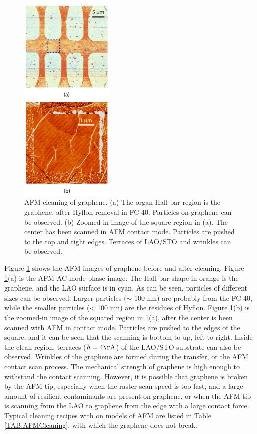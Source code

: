 \documentclass[pdflatex, sectionletters, 12pt]{pittetd}    %
\begin{document}
\begin{figure}[p]
	\centering
	\includegraphics[width=0.4\textwidth]{Drawing/GrapheneAC.pdf}
	\caption{AFM cleaning of graphene. (a) The organ Hall bar region is the graphene, after Hyflon removal in FC-40. Particles on graphene can be observed. (b) Zoomed-in image of the square region in (a). The center has been scanned in AFM contact mode. Particles are pushed to the top and right edges. Terraces of LAO/STO and wrinkles can be observed.}
	\label{FIG:GrapheneAC}
\end{figure}

Figure \ref{FIG:GrapheneAC} shows the AFM images of graphene before and after cleaning. Figure \ref{FIG:GrapheneAC}(a) is the AFM AC mode phase image. The Hall bar shape in orange is the graphene, and the LAO surface is in cyan. As can be seen, particles of different sizes can be observed. Larger particles ($\sim$ 100 nm) are probably from the FC-40, while the smaller particles (< 100 nm) are the residues of Hyflon. Figure \ref{FIG:GrapheneAC}(b) is the zoomed-in image of the squared region in \ref{FIG:GrapheneAC}(a), after the center is been scanned with AFM in contact mode. Particles are pushed to the edges of the square, and it can be seen that the scanning is bottom to up, left to right. Inside the clean region, terraces ($h = 4 \mathrm{\AA}$) of the LAO/STO substrate can also be observed. Wrinkles of the graphene are formed during the transfer, or the AFM contact scan process. The mechanical strength of graphene is high enough\cite{lee2008measurement} to withstand the contact scanning. However, it is possible that graphene is broken by the AFM tip, especially when the raster scan speed is too fast, and a large amount of resilient contaminants are present on graphene, or when the AFM tip is scanning from the LAO to graphene from the edge with a large contact force. Typical cleaning recipes with on models of AFM are listed in Table \ref{TAB:AFMCleaning}, with which the graphene does not break.
\\
\end{document}
